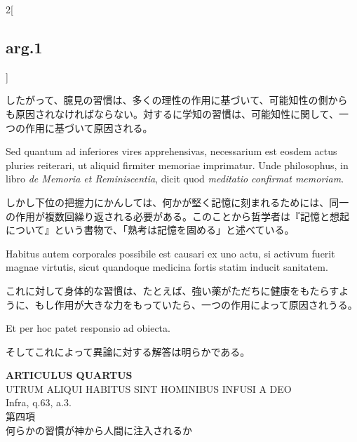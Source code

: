 \documentclass[paper=a4paper,fontsize=10pt,jafontsize=9pt,titlepage]{jlreq}
\begin{document}
\begin{paracol}{2}[\subsection{arg.1}]
\switchcolumn

したがって、臆見の習慣は、多くの理性の作用に基づいて、可能知性の側から
も原因されなければならない。対するに学知の習慣は、可能知性に関して、一
つの作用に基づいて原因される。

\switchcolumn*

Sed quantum ad inferiores vires apprehensivas, necessarium est eosdem
actus pluries reiterari, ut aliquid firmiter memoriae imprimatur.
Unde philosophus, in libro {\itshape de Memoria et Reminiscentia},
dicit quod {\itshape meditatio confirmat memoriam}.

\switchcolumn

しかし下位の把握力にかんしては、何かが堅く記憶に刻まれるためには、同一
の作用が複数回繰り返される必要がある。このことから哲学者は『記憶と想起
について』という書物で、「熟考は記憶を固める」と述べている。

\switchcolumn*

Habitus autem corporales possibile est causari ex uno actu, si activum
fuerit magnae virtutis, sicut quandoque medicina fortis statim inducit
sanitatem.

\switchcolumn

これに対して身体的な習慣は、たとえば、強い薬がただちに健康をもたらすよ
うに、もし作用が大きな力をもっていたら、一つの作用によって原因されうる。

\switchcolumn*

Et per hoc patet responsio ad obiecta.

\switchcolumn

そしてこれによって異論に対する解答は明らかである。

\end{paracol}
\newpage
{}
{}
\setcounter{section}{4}
\setcounter{subsection}{0}



\begin{center}
{\Large {\bfseries ARTICULUS QUARTUS}}\\ {\large UTRUM ALIQUI HABITUS SINT
HOMINIBUS INFUSI A DEO}\\ {\footnotesize Infra, q.63, a.3.}\\ {\Large
第四項\\何らかの習慣が神から人間に注入されるか}
\end{center}
\end{document}

